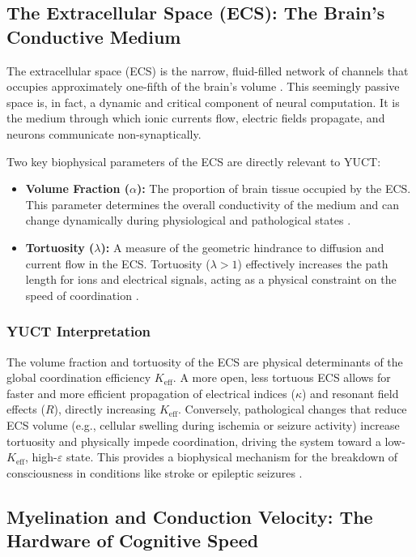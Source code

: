 \documentclass[12pt,a4paper]{article}
\begin{document}
	\subsection{The Extracellular Space (ECS): The Brain's Conductive Medium}
	
	The extracellular space (ECS) is the narrow, fluid-filled network of channels that occupies approximately one-fifth of the brain's volume \cite{Nicholson2006}. This seemingly passive space is, in fact, a dynamic and critical component of neural computation. It is the medium through which ionic currents flow, electric fields propagate, and neurons communicate non-synaptically.
	
	Two key biophysical parameters of the ECS are directly relevant to YUCT:
	
	\begin{itemize}
		\item \textbf{Volume Fraction (\(\alpha\)):} The proportion of brain tissue occupied by the ECS. This parameter determines the overall conductivity of the medium and can change dynamically during physiological and pathological states \cite{Sykova2008}.
		\item \textbf{Tortuosity (\(\lambda\)):} A measure of the geometric hindrance to diffusion and current flow in the ECS. Tortuosity (\(\lambda > 1\)) effectively increases the path length for ions and electrical signals, acting as a physical constraint on the speed of coordination \cite{Nicholson2006}.
	\end{itemize}
	
	\subsubsection*{YUCT Interpretation}
	The volume fraction and tortuosity of the ECS are physical determinants of the global coordination efficiency \(K_{\mathrm{eff}}\). A more open, less tortuous ECS allows for faster and more efficient propagation of electrical indices (\(\kappa\)) and resonant field effects (\(R\)), directly increasing \(K_{\mathrm{eff}}\). Conversely, pathological changes that reduce ECS volume (e.g., cellular swelling during ischemia or seizure activity) increase tortuosity and physically impede coordination, driving the system toward a low-\(K_{\mathrm{eff}}\), high-\(\varepsilon\) state. This provides a biophysical mechanism for the breakdown of consciousness in conditions like stroke or epileptic seizures \cite{Arranz2023}.
	
	\subsection{Myelination and Conduction Velocity: The Hardware of Cognitive Speed}
	
\end{document}
